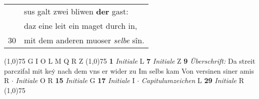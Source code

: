 \documentclass[8pt,a4paper,notitlepage]{article}
\begin{document}
\begin{table}[ht]
\begin{minipage}[t]{0.5\linewidth}
\begin{tabular}{rl}
 & sus galt zwei bliwen \textbf{der} gast:\\ 
 & daz eine leit ein maget durch in,\\ 
30 & mit dem anderen muoser \textit{selbe} sîn.\\ 
\end{tabular}
\scriptsize
\line(1,0){75} \newline
G I O L M Q R Z \newline
\line(1,0){75} \newline
\textbf{1} \textit{Initiale} L  \textbf{7} \textit{Initiale} Z  \textbf{9} \textit{Überschrift:} Da streit parczifal mit keẏ nach dem vns er wider zu Im selbs kam Von versinen siner amis R   $\cdot$ \textit{Initiale} O R  \textbf{15} \textit{Initiale} G  \textbf{17} \textit{Initiale} I   $\cdot$ \textit{Capitulumzeichen} L  \textbf{29} \textit{Initiale} R  \newline
\line(1,0){75} \newline

\end{minipage}
\end{table}
\end{document}
